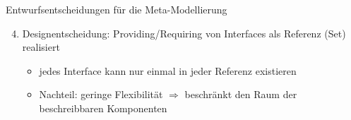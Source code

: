 \begin{frame}{Entwurfsentscheidungen für die Meta-Modellierung}
	\begin{enumerate}
		\setcounter{enumi}{3}
		\item Designentscheidung: Providing/Requiring von Interfaces als Referenz (Set) realisiert
		\begin{itemize}
			\item jedes Interface kann nur einmal in jeder Referenz existieren
			\item Nachteil: geringe Flexibilität $\Rightarrow$ beschränkt den Raum der beschreibbaren Komponenten
		\end{itemize}
	\end{enumerate}
\end{frame}